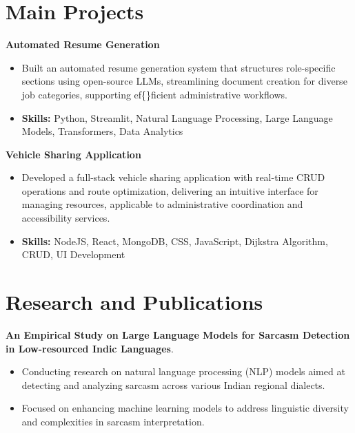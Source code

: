 \documentclass[a4paper,11pt]{article}
\begin{document}
\section{\textbf{Main Projects}}

\vspace{1mm}
  \textbf{Automated Resume Generation  }
\vspace{-1.5mm} %
\begin{itemize}
  \item Built an automated resume generation system that structures role-specific sections using open-source LLMs, streamlining document creation for diverse job categories, supporting ef\{\}ficient administrative workflows.
\vspace{-3mm}
  \item \textbf{Skills:} Python, Streamlit, Natural Language Processing, Large Language Models, Transformers, Data Analytics
\end{itemize}


\vspace{1mm}
   \textbf{Vehicle Sharing Application }
\vspace{-1.5mm} %
\begin{itemize}
  \item Developed a full-stack vehicle sharing application with real-time CRUD operations and route optimization, delivering an intuitive interface for managing resources, applicable to administrative coordination and accessibility services.
\vspace{-3mm}
  \item \textbf{Skills:} NodeJS, React, MongoDB, CSS, JavaScript, Dijkstra Algorithm, CRUD, UI Development
\end{itemize}



\section{\textbf{Research and Publications} \hfill }
\vspace{1mm}
  \textbf{An Empirical Study on Large Language Models for Sarcasm Detection in Low-resourced Indic Languages}.
\vspace{-1mm} %
\begin{itemize}
  \item Conducting research on natural language processing (NLP) models aimed at detecting and analyzing sarcasm across various Indian regional dialects.
\vspace{-3mm}
  \item Focused on enhancing machine learning models to address linguistic diversity and complexities in sarcasm interpretation.
\end{itemize}
\end{document}
